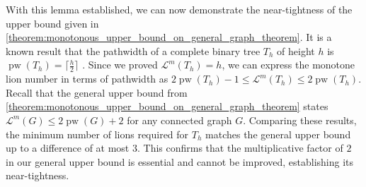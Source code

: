\documentclass[a4paper,UKenglish,cleveref, autoref, thm-restate]{lipics-v2021}
\begin{document}
With this lemma established, we can now demonstrate the near-tightness of the upper bound given in \cref{theorem:monotonous_upper_bound_on_general_graph_theorem}. 
It is a known result that the pathwidth of a complete binary tree $T_h$ of height $h$ is $\operatorname{pw}(T_h) = \lceil \frac{h}{2} \rceil$ \cite{bodlaender1998partial}. 
Since we proved $\mathcal{L}^m(T_h) = h$, we can express the monotone lion number in terms of pathwidth as $2\operatorname{pw}(T_h) - 1 \le \mathcal{L}^m(T_h) \le 2\operatorname{pw}(T_h)$. 
Recall that the general upper bound from \cref{theorem:monotonous_upper_bound_on_general_graph_theorem} states $\mathcal{L}^m(G) \le 2\operatorname{pw}(G) + 2$ for any connected graph $G$. 
Comparing these results, the minimum number of lions required for $T_h$ matches the general upper bound up to a difference of at most $3$. 
This confirms that the multiplicative factor of $2$ in our general upper bound is essential and cannot be improved, establishing its near-tightness.
\end{document}
